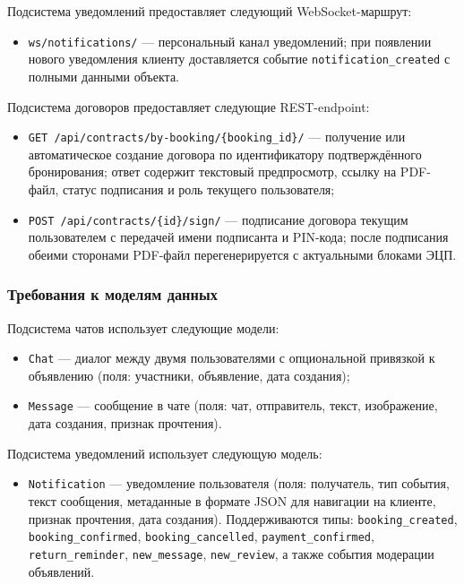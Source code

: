 Подсистема уведомлений предоставляет следующий WebSocket-маршрут:
\begin{itemize}
    \item \texttt{ws/notifications/} — персональный канал уведомлений; при появлении нового уведомления клиенту доставляется событие \texttt{notification\_created} с полными данными объекта.
\end{itemize}

Подсистема договоров предоставляет следующие REST-endpoint:
\begin{itemize}
    \item \texttt{GET /api/contracts/by-booking/\{booking\_id\}/} — получение или автоматическое создание договора по идентификатору подтверждённого бронирования; ответ содержит текстовый предпросмотр, ссылку на PDF-файл, статус подписания и роль текущего пользователя;
    \item \texttt{POST /api/contracts/\{id\}/sign/} — подписание договора текущим пользователем с передачей имени подписанта и PIN-кода; после подписания обеими сторонами PDF-файл перегенерируется с актуальными блоками ЭЦП.
\end{itemize}

\subsubsection{Требования к моделям данных}

Подсистема чатов использует следующие модели:
\begin{itemize}
    \item \texttt{Chat} — диалог между двумя пользователями с опциональной привязкой к объявлению (поля: участники, объявление, дата создания);
    \item \texttt{Message} — сообщение в чате (поля: чат, отправитель, текст, изображение, дата создания, признак прочтения).
\end{itemize}

Подсистема уведомлений использует следующую модель:
\begin{itemize}
    \item \texttt{Notification} — уведомление пользователя (поля: получатель, тип события, текст сообщения, метаданные в формате JSON для навигации на клиенте, признак прочтения, дата создания). Поддерживаются типы: \texttt{booking\_created}, \texttt{booking\_confirmed}, \texttt{booking\_cancelled}, \texttt{payment\_confirmed}, \texttt{return\_reminder}, \texttt{new\_message}, \texttt{new\_review}, а также события модерации объявлений.
\end{itemize}

